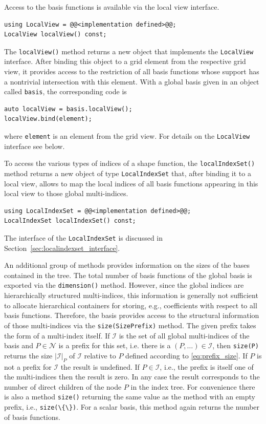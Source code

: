 \documentclass[a4paper,10pt,headings=normal,bibliography=totoc]{scrartcl}
\newcommand{\cpp}[1]{\lstinline[basicstyle=\ttfamily]!#1!}
\begin{document}
Access to the basis functions is available via the
local view interface.
\begin{lstlisting}[style=Interface]
using LocalView = @@<implementation defined>@@;
LocalView localView() const;
\end{lstlisting}
The \cpp{localView()} method returns a new object that implements the \cpp{LocalView} interface.
After binding this object to a
grid element from the respective grid view, it provides access
to the restriction of all basis functions whose support has a
nontrivial intersection with this element.  With a global basis given in an object called \cpp{basis},
the corresponding code is
\begin{lstlisting}[style=Example]
auto localView = basis.localView();
localView.bind(element);
\end{lstlisting}
where \cpp{element} is an element from the grid view.
For details on the
\cpp{LocalView} interface see below.

To access the various types of indices of a shape function,
the \cpp{localIndexSet()} method
returns a new object of type \cpp{LocalIndexSet} that, after
binding it to a local view, allows to map the local indices
of all basis functions appearing in this local view to those
global multi-indices.
\begin{lstlisting}[style=Interface]
using LocalIndexSet = @@<implementation defined>@@;
LocalIndexSet localIndexSet() const;
\end{lstlisting}
The interface of the \cpp{LocalIndexSet} is discussed in Section~\ref{sec:localindexset_interface}.

An additional group of methods provides information on the sizes of the bases
contained in the tree.
The total number of basis functions of the global basis is
exported via the \cpp{dimension()} method. However, since
the global indices are hierarchically structured multi-indices,
this information is generally not
sufficient to allocate hierarchical containers for storing,
e.g., coefficients with respect to all basis functions.
Therefore, the basis provides access to the structural
information of those multi-indices via the \cpp{size(SizePrefix)}
method. The given prefix takes the form of a multi-index itself.
If $\mathcal{I}$ is the set of all global multi-indices of the
basis and $P \in \mathcal{N}$ is a prefix for this set,
i.e. there is a $(P,\dots) \in \mathcal{I}$, then
\cpp{size(P)} returns the size $|\mathcal{I}|_P$ of
$\mathcal{I}$ relative to $P$ defined according to \eqref{eq:prefix_size}.
If $P$ is not a prefix for $\mathcal{I}$ the result is undefined.
If $P \in \mathcal{I}$, i.e., the prefix is itself one of the multi-indices
then the result is zero.
In any case the result corresponds to the number of direct children
of the node $P$ in the index tree.
For convenience there is also a method \cpp{size()} returning the same
value as the method with an empty prefix, i.e., \cpp{size(\{\})}.
For a scalar basis, this method again returns the number of basis functions.
\end{document}
